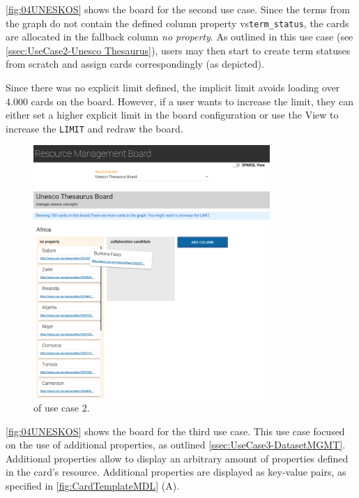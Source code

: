 \newpage

\noindent \autoref{fig:04UNESKOS} shows the board for the second use case. Since the terms from the  graph do not contain the defined column property \acrshort{vs}\texttt{term\_status}, the cards are allocated in the fallback column \textit{no property}. As outlined in this use case (see \autoref{ssec:UseCase2-Unesco Thesaurus}), users may then start to create term statuses from scratch and assign cards correspondingly (as depicted).

Since there was no explicit limit defined, the implicit limit avoids loading over 4.000 cards on the board. However, if a user wants to increase the limit, they can either set a higher explicit limit in the board configuration or use the  View to increase the \texttt{LIMIT} and redraw the board.


\begin{figure}[H]
\centering
\includegraphics[width=0.80\textwidth]{img/04-UNESKOS.png}
	\caption[ of Use Case 2]{ of use case 2.}
	\label{fig:04UNESKOS}
\end{figure}


\newpage

\noindent \autoref{fig:04UNESKOS} shows the board for the third use case. This use case focused on the use of additional properties, as outlined  \autoref{ssec:UseCase3-DatasetMGMT}. Additional properties allow to display an arbitrary amount of properties defined in the card’s resource. Additional properties are displayed as key-value pairs, as specified in \autoref{fig:CardTemplateMDL} (A\libertineOsF).

